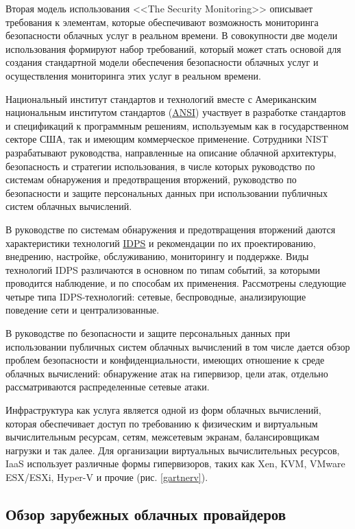 Вторая модель использования <<The Security Monitoring>> описывает требования к элементам, которые обеспечивают возможность мониторинга безопасности облачных услуг в реальном времени.
В совокупности две модели использования формируют набор требований, который может стать основой для создания стандартной модели обеспечения безопасности облачных услуг и осуществления мониторинга этих услуг в реальном времени.

Национальный институт стандартов и технологий вместе с Американским национальным институтом стандартов (\hyperlink{ansi}{ANSI}) участвует в разработке стандартов и спецификаций к программным решениям, используемым как в государственном секторе США, так и имеющим коммерческое применение.
Сотрудники NIST разрабатывают руководства, направленные на описание облачной архитектуры, безопасность и стратегии использования, в числе которых руководство по системам обнаружения и предотвращения вторжений, руководство по безопасности и защите персональных данных при использовании публичных систем облачных вычислений.

В руководстве по системам обнаружения и предотвращения вторжений даются характеристики технологий \hyperlink{idps}{IDPS} и рекомендации по их проектированию, внедрению, настройке, обслуживанию, мониторингу и поддержке.
Виды технологий IDPS различаются в основном по типам событий, за которыми проводится наблюдение, и по способам их применения.
Рассмотрены следующие четыре типа IDPS-технологий: сетевые, беспроводные, анализирующие поведение сети и централизованные.

В руководстве по безопасности и защите персональных данных при использовании публичных систем облачных вычислений в том числе дается обзор проблем безопасности и конфиденциальности, имеющих отношение к среде облачных вычислений: обнаружение атак на гипервизор, цели атак, отдельно рассматриваются распределенные сетевые атаки.

Инфраструктура как услуга является одной из форм облачных вычислений, которая обеспечивает доступ по требованию к физическим и виртуальным вычислительным ресурсам, сетям, межсетевым экранам, балансировщикам нагрузки и так далее.
Для организации виртуальных вычислительных ресурсов, IaaS использует различные формы гипервизоров, таких как Xen, KVM, VMware ESX/ESXi, Hyper-V и прочие (рис. \ref{gartnerv}).


\subsection{Обзор зарубежных облачных провайдеров}

